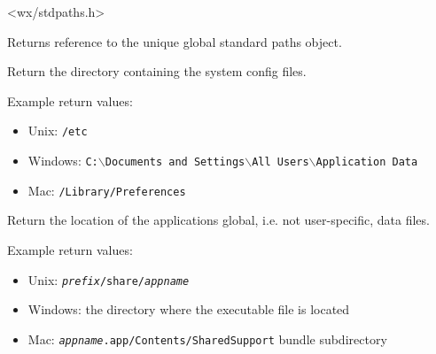 
<wx/stdpaths.h>




\label{wxstandardpathsget}


Returns reference to the unique global standard paths object.


\label{wxstandardpathsgetconfigdir}


Return the directory containing the system config files.

Example return values:
\begin{itemize}
    \item Unix: \texttt{/etc}
    \item Windows: \texttt{C:$\backslash$Documents and Settings$\backslash$All Users$\backslash$Application Data}
    \item Mac: \texttt{/Library/Preferences}
\end{itemize}




\label{wxstandardpathsgetdatadir}


Return the location of the applications global, i.e. not user-specific,
data files.

Example return values:
\begin{itemize}
    \item Unix: \texttt{\textit{prefix}/share/\textit{appname}}
    \item Windows: the directory where the executable file is located
    \item Mac: \texttt{\textit{appname}.app/Contents/SharedSupport} bundle subdirectory
\end{itemize}




\label{wxstandardpathsgetinstallprefix}


